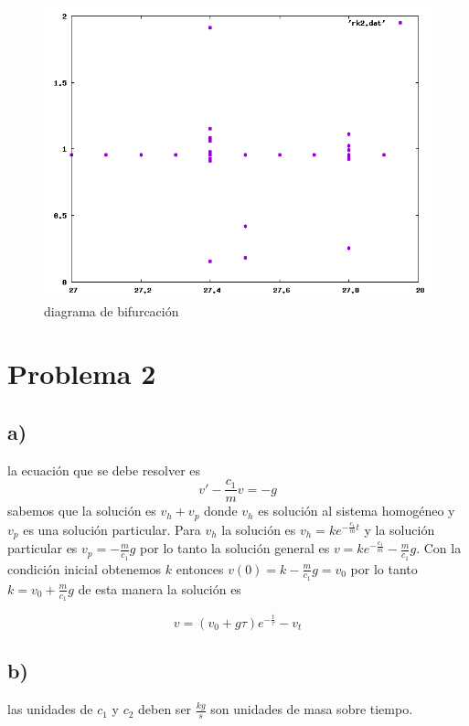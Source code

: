\documentclass[10pt,twocolumn]{article}
\begin{document}
\begin{figure}[h]
    \centering
	\begin{minipage}{.4\textwidth}
	    \includegraphics[width=\textwidth]{bif.png}
    	\caption{diagrama de bifurcaci\'on}
	\end{minipage}
\end{figure}


\section{Problema 2}
\subsection{a)}
la ecuaci\'on que se debe resolver es
\begin{equation}
	v'-\frac{c_1}{m}v=-g
	\label{name}
\end{equation}
sabemos que la soluci\'on es $v_h +v_p$ donde $v_h$ es soluci\'on al sistema homog\'eneo y $v_p$ es una 
soluci\'on particular. Para $v_h$ la soluci\'on es $v_h=ke^{-\frac{c_1}{m}t}$ y la soluci\'on particular es 
$v_p=-\frac{m}{c_1}g$ por lo tanto la soluci\'on general es $v=ke^{-\frac{c_1}{m}}-\frac{m}{c_1}g$. Con la 
condici\'on  inicial obtenemos $k$ entonces $v(0)=k-\frac{m}{c_1}g=v_0$ por lo tanto $k=v_0+\frac{m}{c_1}g$ 
de 
esta manera la soluci\'on es 

\begin{equation}
	v=\left(v_0+g\tau\right)e^{-\frac{t}{\tau}}-v_t
\label{sol}
\end{equation}

\subsection{b)}
las unidades de $c_1$ y $c_2$ deben ser $\frac{kg}{s}$ son unidades de masa sobre tiempo.
\end{document}

